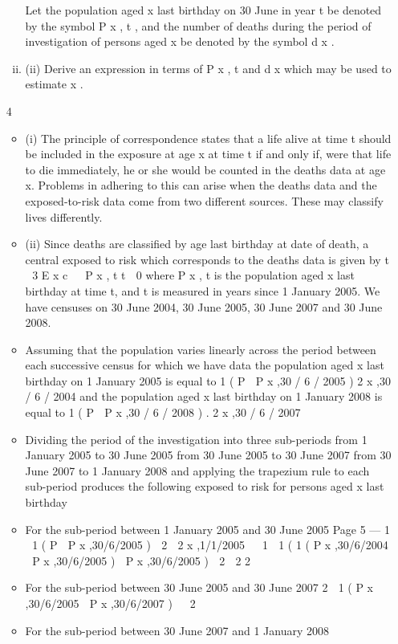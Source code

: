 \documentclass[a4paper,12pt]{article}
\begin{document}
\begin{enumerate}
\begin{enumerate}[(i)]
Let the population aged x last birthday on 30 June in year t be denoted by the symbol
P x , t , and the number of deaths during the period of investigation of persons aged x be
denoted by the symbol d x .
\item (ii)
Derive an expression in terms of P x , t and d x which may be used to estimate
\mu x .
\end{enumerate}
\newpage
4
\begin{itemize}
\item (i) The principle of correspondence states that a life alive at time t should be
included in the exposure at age x at time t if and only if, were that life to die
immediately, he or she would be counted in the deaths data at age x. Problems
in adhering to this can arise when the deaths data and the exposed-to-risk data
come from two different sources. These may classify lives differently.
\item (ii) Since deaths are classified by age last birthday at date of death, a central
exposed to risk which corresponds to the deaths data is given by
t  3
E x c

 P x , t
t  0
where P x , t is the population aged x last birthday at time t, and t is measured in
years since 1 January 2005. We have censuses on 30 June 2004, 30 June 2005,
30 June 2007 and 30 June 2008.
\item Assuming that the population varies linearly across the period between each
successive census for which we have data the population aged x last birthday
on 1 January 2005 is equal to
1 ( P
 P x ,30 / 6 / 2005 )
2 x ,30 / 6 / 2004
and the population aged x last birthday on 1 January 2008 is equal to
1 ( P
 P x ,30 / 6 / 2008 ) .
2 x ,30 / 6 / 2007
\item Dividing the period of the investigation into three sub-periods
from 1 January 2005 to 30 June 2005
from 30 June 2005 to 30 June 2007
from 30 June 2007 to 1 January 2008
and applying the trapezium rule to each sub-period produces the following
exposed to risk for persons aged x last birthday
\item For the sub-period between 1 January 2005 and 30 June 2005
Page 5  — %
1  1 ( P
 P x ,30/6/2005 ) 
2  2 x ,1/1/2005

 1  1 ( 1 ( P x ,30/6/2004  P x ,30/6/2005 )  P x ,30/6/2005 ) 
2  2 2

\item For the sub-period between 30 June 2005 and 30 June 2007
2  1 ( P x ,30/6/2005  P x ,30/6/2007 ) 
 2

\item For the sub-period between 30 June 2007 and 1 January 2008

\end{itemize}
\end{enumerate}
\end{document}
